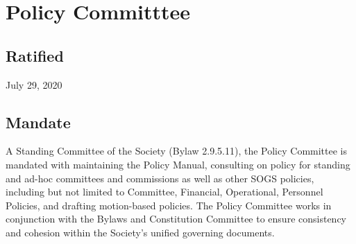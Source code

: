 \section{Policy Committtee}

\subsection{Ratified}
July 29, 2020

\subsection{Mandate}
A Standing Committee of the Society (Bylaw 2.9.5.11), the Policy Committee is mandated with maintaining the Policy Manual, consulting on policy for standing and ad-hoc committees and commissions as well as other SOGS policies, including but not limited to Committee, Financial, Operational, Personnel Policies, and drafting motion-based policies. The Policy Committee works in conjunction with the Bylaws and Constitution Committee to ensure consistency and cohesion within the Society's unified governing documents.

